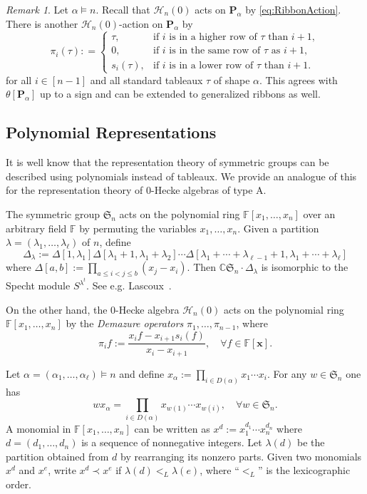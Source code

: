 \documentclass{amsart}
\newtheorem*{Young's Rule}{Young's Rule}
\theoremstyle{definition}
\theoremstyle{remark}
\newtheorem{remark}[theorem]{Remark}
\numberwithin{equation}{section}
\begin{document}
\begin{remark}
Let $\alpha\models n$. Recall that ${\mathcal{H}}_n(0)$ acts on ${\mathbf{P}}_\alpha$ by \eqref{eq:RibbonAction}.   There is another ${\mathcal{H}}_n(0)$-action on ${\mathbf{P}}_\alpha$ by 
\[ \pi_i(\tau): = \begin{cases}
\tau, &  \textrm{if $i$ is in a higher row of $\tau$ than $i+1$},\\
0, & \textrm{if $i$ is in the same row of $\tau$ as $i+1$}, \\
s_i(\tau), & \textrm{if $i$ is in a lower row of $\tau$ than $i+1$}.
\end{cases} \]
for all $i\in[n-1]$ and all standard tableaux $\tau$ of shape $\alpha$. This agrees with $\theta[{\mathbf{P}}_\alpha]$ up to a sign and can be extended to generalized ribbons as well.
\end{remark}

\subsection{Polynomial Representations}
It is well know that the representation theory of symmetric groups can be described using polynomials instead of tableaux. We provide an analogue of this for the representation theory of 0-Hecke algebras of type A.

The symmetric group $\mathfrak S_n$ acts on the polynomial ring ${{\mathbb F}}[x_1,\ldots,x_n]$ over an arbitrary field ${{\mathbb F}}$ by permuting the variables $x_1,\ldots,x_n$. Given a partition $\lambda=(\lambda_1,\ldots,\lambda_\ell)$ of $n$, define 
\[ \Delta_\lambda:=\Delta[1,\lambda_1] \Delta[\lambda_1+1,\lambda_1+\lambda_2] \cdots \Delta[\lambda_1+\cdots+\lambda_{\ell-1}+1,\lambda_1+\cdots+\lambda_\ell] \]
where $\Delta[a,b]:=\prod_{a\le i<j\le b} (x_j-x_i)$. Then ${{\mathbb C}}{{\mathfrak S}}_n\cdot \Delta_\lambda$ is isomorphic to the Specht module $S^{\lambda^t}$. See e.g. Lascoux~\cite{PolySn}.

On the other hand, the 0-Hecke algebra ${\mathcal{H}}_n(0)$ acts on the polynomial ring ${{\mathbb F}}[x_1,\ldots,x_n]$ by the \emph{Demazure operators} $\pi_1,\ldots,\pi_{n-1}$, where
\begin{equation}\label{eq:Demazure}
\pi_if:= \frac{x_if-x_{i+1}s_i(f)}{x_i-x_{i+1}},\quad \forall f\in{{\mathbb F}}[{{\mathbf x}}].
\end{equation}

Let $\alpha=(\alpha_1,\ldots,\alpha_\ell)\models n$ and define $x_\alpha:=\prod_{i\in D(\alpha)} x_1\cdots x_i$. For any $w\in {{\mathfrak S}}_n$ one has
\[ wx_\alpha = \prod_{i\in D(\alpha)} x_{w(1)}\cdots x_{w(i)}, \quad \forall w\in{{\mathfrak S}}_n. \]
A monomial in ${{\mathbb F}}[x_1,\ldots,x_n]$ can be written as $x^d:=x_1^{d_1}\cdots x_n^{d_n}$ where $d=(d_1,\ldots,d_n)$ is a sequence of nonnegative integers. Let $\lambda(d)$ be the partition obtained from $d$ by rearranging its nonzero parts. Given two monomials $x^d$ and $x^e$, write $x^d\prec x^e$ if $\lambda(d)<_L\lambda(e)$, where ``$<_L$'' is the lexicographic order.
\end{document}

